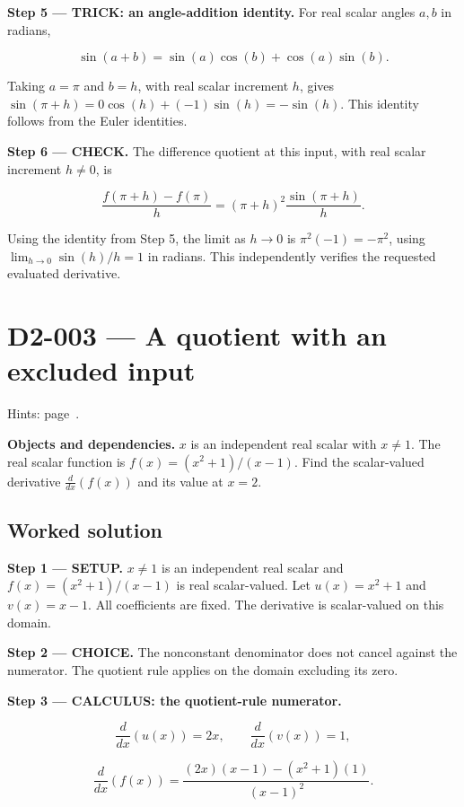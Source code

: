 \documentclass[11pt,oneside,openany]{book}
\begin{document}
\endgroup
\begingroup\color{TrickPurple}
\textbf{Step 5 --- TRICK: an angle-addition identity.} For real scalar angles
\(a,b\) in radians,

\[
\sin(a+b)=\sin(a)\cos(b)+\cos(a)\sin(b).
\]

Taking \(a=\pi\) and \(b=h\), with real scalar increment \(h\), gives
\(\sin(\pi+h)=0\cos(h)+(-1)\sin(h)=-\sin(h)\).
This identity follows from the Euler identities.

\endgroup
\textbf{Step 6 --- CHECK.} The difference quotient at this input, with real scalar
increment \(h\ne0\), is

\[
\frac{f(\pi+h)-f(\pi)}h
=(\pi+h)^2\frac{\sin(\pi+h)}h.
\]

Using the identity from Step 5, the limit as
\(h\to0\) is \(\pi^2(-1)=-\pi^2\), using \(\lim_{h\to0}\sin(h)/h=1\) in radians.
This independently verifies the requested evaluated derivative.
\clearpage
\section{D2-003 --- A quotient with an excluded input}
\label{problem:D2-003}
{\small Hints: page~\pageref{hints:D2-003}.}\par\medskip

\textbf{Objects and dependencies.} \(x\) is an independent real scalar with \(x\ne1\).
The real scalar function is \(f(x)=(x^2+1)/(x-1)\). Find the scalar-valued derivative
\(\frac{d}{dx}\left(f(x)\right)\) and its value at \(x=2\).
\subsection*{Worked solution}

\textbf{Step 1 --- SETUP.} \(x\ne1\) is an independent real scalar and
\(f(x)=(x^2+1)/(x-1)\) is real scalar-valued. Let \(u(x)=x^2+1\) and \(v(x)=x-1\).
All coefficients are fixed. The derivative is scalar-valued on this domain.

\begin{ChoiceStep}
\textbf{Step 2 --- CHOICE.} The nonconstant denominator does not cancel against the numerator. The quotient rule applies on the domain excluding its zero.

\end{ChoiceStep}
\textbf{Step 3 --- CALCULUS: the quotient-rule numerator.}

\[
\frac{d}{dx}\left(u(x)\right)=2x,\qquad
\frac{d}{dx}\left(v(x)\right)=1,
\]

\[
\frac{d}{dx}\left(f(x)\right)
=\frac{(2x)(x-1)-(x^2+1)(1)}{(x-1)^2}.
\]
\end{document}
